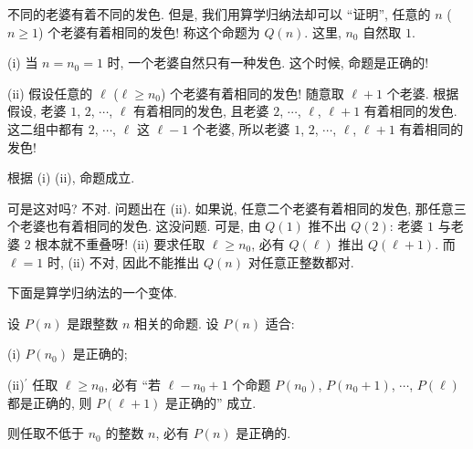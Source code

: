 \begin{example}
    不同的老婆有着不同的发色. 但是, 我们用算学归纳法却可以 ``证明'', 任意的 $n$ ($n \geq 1$) 个老婆有着相同的发色! 称这个命题为 $Q(n)$. 这里, $n_0$ 自然取 $1$.

    (i) 当 $n=n_0=1$ 时, 一个老婆自然只有一种发色. 这个时候, 命题是正确的!

    (ii) 假设任意的 $\ell$ ($\ell \geq n_0$) 个老婆有着相同的发色! 随意取 $\ell + 1$ 个老婆. 根据假设, 老婆 $1$, $2$, $\cdots$, $\ell$ 有着相同的发色, 且老婆 $2$, $\cdots$, $\ell$, $\ell+1$ 有着相同的发色. 这二组中都有 $2$, $\cdots$, $\ell$ 这 $\ell-1$ 个老婆, 所以老婆 $1$, $2$, $\cdots$, $\ell$, $\ell+1$ 有着相同的发色!

    根据 (i) (ii), 命题成立.

    可是这对吗? 不对. 问题出在 (ii). 如果说, 任意二个老婆有着相同的发色, 那任意三个老婆也有着相同的发色. 这没问题. 可是, 由 $Q(1)$ 推不出 $Q(2)$: 老婆 $1$ 与老婆 $2$ 根本就不重叠呀! (ii) 要求任取 $\ell \geq n_0$, 必有 $Q(\ell)$ 推出 $Q(\ell+1)$. 而 $\ell = 1$ 时, (ii) 不对, 因此不能推出 $Q(n)$ 对任意正整数都对.
\end{example}

下面是算学归纳法的一个变体.

\begin{proposition}
    设 $P(n)$ 是跟整数 $n$ 相关的命题. 设 $P(n)$ 适合:

    (i) $P(n_0)$ 是正确的;

    (ii)$^{\prime}$ 任取 $\ell \geq n_0$, 必有 ``若 $\ell - n_0 + 1$ 个命题 $P(n_0)$, $P(n_0 + 1)$, $\cdots$, $P(\ell)$ 都是正确的, 则 $P(\ell + 1)$ 是正确的'' 成立.

    则任取不低于 $n_0$ 的整数 $n$, 必有 $P(n)$ 是正确的.
\end{proposition}

